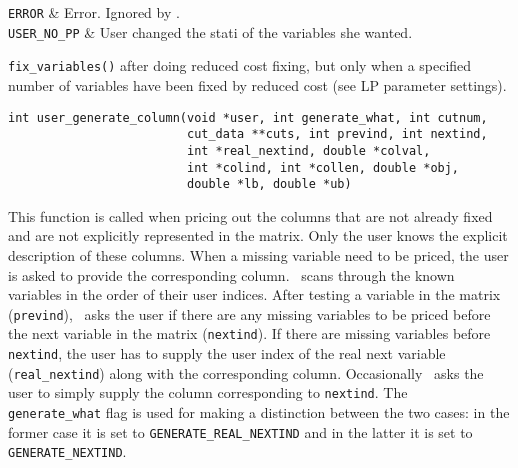 \returns

{\tt ERROR} & Error. Ignored by \BB. \\
{\tt USER\_NO\_PP} & User changed the stati of the variables she
wanted. \\
\et

\item[Wrapper invoked from:] {\tt fix\_variables()} after doing reduced cost
fixing, but only when a specified number of variables have been fixed
by reduced cost (see LP parameter settings).

\ed
\vspace{1ex}


\begin{verbatim}
int user_generate_column(void *user, int generate_what, int cutnum, 
                         cut_data **cuts, int prevind, int nextind, 
                         int *real_nextind, double *colval, 
                         int *colind, int *collen, double *obj,
                         double *lb, double *ub)
\end{verbatim}

\bd
\describe

This function is called when pricing out the columns that are not
already fixed and are not explicitly represented in the matrix. Only
the user knows the explicit description of these columns. When a
missing variable need to be priced, the user is asked to provide the
corresponding column. \BB\ scans through the known variables in the
order of their user indices. After testing a variable in the matrix
({\tt prevind}), \BB\ asks the user if there are any missing variables
to be priced before the next variable in the matrix ({\tt nextind}).
If there are missing variables before {\tt nextind}, the user has to
supply the user index of the real next variable ({\tt real\_nextind})
along with the corresponding column. Occasionally \BB\ asks the user to
simply supply the column corresponding to {\tt nextind}. The {\tt
generate\_what} flag is used for making a distinction between the two
cases: in the former case it is set to {\tt GENERATE\_REAL\_NEXTIND}
and in the latter it is set to {\tt GENERATE\_NEXTIND}.

\args

